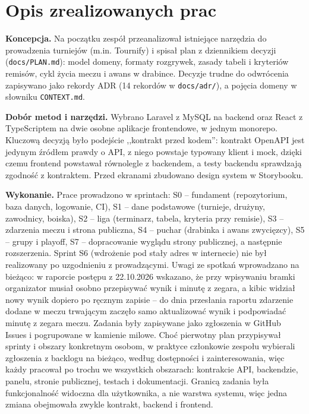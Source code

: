 \documentclass[11pt,a4paper,oneside]{article}
\newif\ifpodpowiedzi
\newcommand{\podpowiedz}[1]{\ifpodpowiedzi\par\begingroup\small\color{hintcolor}\textit{Wskazówka: #1}\par\endgroup\fi}
\begin{document}
\section{Opis zrealizowanych prac}
\podpowiedz{Podsumuj etapy realizacji: koncepcję, dobór metod i narzędzi, wykonanie, integrację oraz weryfikację. Dostosuj opis do charakteru projektu; może dotyczyć aplikacji, animacji, prototypu lub innego rezultatu. Nie kopiuj kolejnych raportów bez opracowania podsumowania.}
\textbf{Koncepcja.} Na początku zespół przeanalizował istniejące narzędzia do prowadzenia turniejów (m.in. Tournify) i spisał plan z dziennikiem decyzji (\texttt{docs/PLAN.md}): model domeny, formaty rozgrywek, zasady tabeli i kryteriów remisów, cykl życia meczu i awans w drabince. Decyzje trudne do odwrócenia zapisywano jako rekordy ADR (14 rekordów w \texttt{docs/adr/}), a pojęcia domeny w słowniku \texttt{CONTEXT.md}.

\textbf{Dobór metod i narzędzi.} Wybrano Laravel z MySQL na backend oraz React z TypeScriptem na dwie osobne aplikacje frontendowe, w jednym monorepo. Kluczową decyzją było podejście ,,kontrakt przed kodem'': kontrakt OpenAPI jest jedynym źródłem prawdy o API, z niego powstaje typowany klient i mock, dzięki czemu frontend powstawał równolegle z backendem, a testy backendu sprawdzają zgodność z kontraktem. Przed ekranami zbudowano design system w Storybooku.

\textbf{Wykonanie.} Prace prowadzono w sprintach: S0 -- fundament (repozytorium, baza danych, logowanie, CI), S1 -- dane podstawowe (turnieje, drużyny, zawodnicy, boiska), S2 -- liga (terminarz, tabela, kryteria przy remisie), S3 -- zdarzenia meczu i strona publiczna, S4 -- puchar (drabinka i awans zwycięzcy), S5 -- grupy i playoff, S7 -- dopracowanie wyglądu strony publicznej, a następnie rozszerzenia. Sprint S6 (wdrożenie pod stały adres w internecie) nie był realizowany po uzgodnieniu z prowadzącymi. Uwagi ze spotkań wprowadzano na bieżąco: w raporcie postępu z 22.10.2026 wskazano, że przy wpisywaniu bramki organizator musiał osobno przepisywać wynik i minutę z zegara, a kibic widział nowy wynik dopiero po ręcznym zapisie -- do dnia przesłania raportu zdarzenie dodane w meczu trwającym zaczęło samo aktualizować wynik i podpowiadać minutę z zegara meczu. Zadania były zapisywane jako zgłoszenia w GitHub Issues i pogrupowane w kamienie milowe. Choć pierwotny plan przypisywał sprinty i obszary konkretnym osobom, w praktyce członkowie zespołu wybierali zgłoszenia z backlogu na bieżąco, według dostępności i zainteresowania, więc każdy pracował po trochu we wszystkich obszarach: kontrakcie API, backendzie, panelu, stronie publicznej, testach i dokumentacji. Granicą zadania była funkcjonalność widoczna dla użytkownika, a nie warstwa systemu, więc jedna zmiana obejmowała zwykle kontrakt, backend i frontend.
\end{document}
